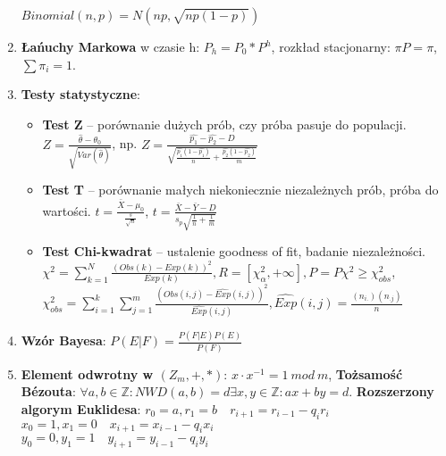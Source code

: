 \documentclass[12pt]{article}
\begin{document}
\begin{enumerate}
        $Binomial(n, p) = N\left(np, \sqrt{np(1-p)}\right)$

        \item \textbf{Łańuchy Markowa} w czasie h:  $P_h = P_0 * P^h$, rozkład stacjonarny:
        $\pi P = \pi$, $\sum \pi_i = 1$.

        \item \textbf{Testy statystyczne}:
        \begin{itemize}[noitemsep]
            \item \textbf{Test Z} -- porównanie dużych prób, czy próba pasuje do populacji.
            $Z = \frac{\hat{\theta} - \theta_0}{\sqrt{Var(\hat{\theta})}}$, np.
            $Z = \frac{\hat{p_1} - \hat{p_2} - D}{\sqrt{\frac{\hat{p_1}(1-\hat{p_1})}{n} + \frac{\hat{p_2}(1-\hat{p_2})}{m}}}$

            \item \textbf{Test T} -- porównanie małych niekoniecznie niezależnych prób, próba do wartości.
            $t = \frac{\bar{X} - \mu_0}{\frac{s}{\sqrt{n}}}$,
            $t = \frac{\bar{X} - \bar{Y} - D}{s_p\sqrt{\frac{1}{n}+\frac{1}{m}}}$

            \item \textbf{Test Chi-kwadrat} -- ustalenie goodness of fit, badanie niezależności.
            $\chi^2 = \sum_{k=1}^{N} \frac{(Obs(k) - Exp(k))^2}{Exp(k)}, R = [\chi_{\alpha}^2, +\infty], P = P{\chi^2 \geq \chi_{obs}^2}$,\\
            $\chi_{obs}^2 = \sum_{i=1}^k \sum_{j=1}^m \frac{(Obs(i,j) - \hat{Exp}(i,j))^2}{\hat{Exp}(i,j)}, \hat{Exp}(i,j) = \frac{(n_{i.})(n_{.j})}{n}$
        \end{itemize}

        \item \textbf{Wzór Bayesa}: $   P(E|F) = \frac{P(F|E) P(E)}{P(F)}$

        \item  \textbf{Element odwrotny w $(Z_m, +, *)$}: $x \cdot x^{-1} = 1 \  mod \  m$,
        \textbf{Tożsamość Bézouta}: $\forall a, b \in \mathbb{Z} : NWD(a,b) = d \exists x, y \in \mathbb{Z}: ax + by = d$.
        \textbf{Rozszerzony algorym Euklidesa}:
        $r_0 = a, r_1 = b \quad r_{i + 1} = r_{i - 1} - q_{i}r_{i}$\\
        $x_0 = 1, x_1 = 0 \quad x_{i + 1} = x_{i - 1} - q_{i}x_{i}$\\
        $y_0 = 0, y_1 = 1 \quad y_{i + 1} = y_{i - 1} - q_{i}y_{i}$


\end{enumerate}
\end{document}
